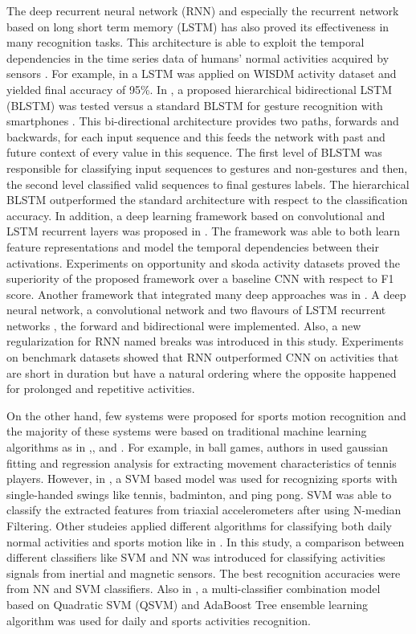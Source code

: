 \documentclass[12pt,a4paper]{article}
\begin{document}
The deep recurrent neural network (RNN) and especially the recurrent network based on long short term memory (LSTM) has also proved its effectiveness in many recognition tasks. This architecture is able to exploit the temporal dependencies in the time series data of humans' normal activities acquired by sensors \cite{hammerla2016deep}. For example, in \cite{chen2016lstm} a LSTM was applied on WISDM activity dataset and yielded final accuracy of 95\%. In \cite{lee2012mobile},  a proposed hierarchical bidirectional LSTM (BLSTM) was tested versus a standard BLSTM for gesture recognition with smartphones . This bi-directional architecture provides two paths, forwards and backwards, for each input sequence and this feeds the network with past and future context of every value in this sequence. The first level of BLSTM was responsible for classifying input  sequences to gestures and non-gestures and then, the second level classified valid sequences to final gestures labels. The hierarchical BLSTM outperformed the standard architecture with respect to the classification accuracy. In addition, a deep learning framework based on convolutional and LSTM recurrent layers was proposed in \cite{ordonez2016deep}. The framework was able to both learn feature representations and model the temporal dependencies between their activations. Experiments on opportunity and skoda activity datasets proved the superiority of the proposed framework over a baseline CNN with respect to F1 score. Another framework that integrated many deep approaches was in \cite{hammerla2016deep}. A deep neural network, a convolutional network and two flavours of LSTM recurrent networks , the forward and bidirectional were implemented. Also, a new regularization for RNN named breaks was introduced in this study. Experiments on benchmark datasets showed that RNN outperformed CNN on activities that are short in duration but have a natural ordering where the opposite happened for prolonged and repetitive activities.  


On the other hand, few systems were proposed for sports motion recognition and the majority of these systems were based on traditional machine learning algorithms as in \cite{fuji2011development} ,\cite{barshan2014recognizing},\cite{lu2016multi} and \cite{wang2015sport}. For example, in ball games, authors in \cite{fuji2011development} used gaussian fitting and regression analysis for extracting movement characteristics of tennis players. However, in \cite{wang2015sport}, a SVM based model was used for recognizing sports with single-handed swings like tennis, badminton, and ping pong. SVM was able to classify the extracted features from triaxial accelerometers after using N-median Filtering. Other studeies applied different algorithms for classifying both daily normal activities and sports motion like in \cite{barshan2014recognizing}. In this study, a comparison between different classifiers like SVM and NN was introduced for classifying activities signals from inertial and magnetic sensors. The best recognition accuracies were from NN and SVM classifiers. Also in  \cite{lu2016multi}, a multi-classifier combination model based on Quadratic SVM (QSVM) and AdaBoost Tree ensemble learning algorithm was used for daily and sports activities recognition.
\end{document}
